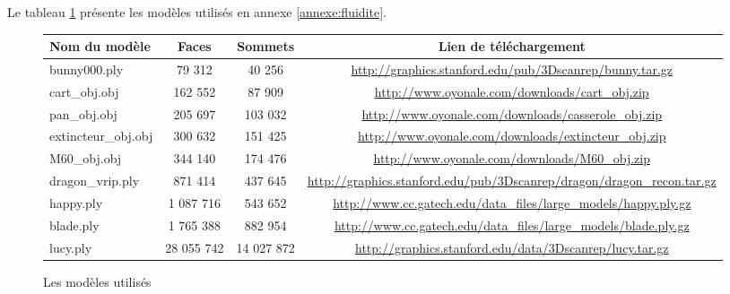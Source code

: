 Le tableau \ref{tab:modeles} présente les modèles utilisés en annexe \ref{annexe:fluidite}.


\begin{figure}[h]
  \begin{changemargin}{-4cm}{-4cm}
    \centering
    \begin{tabular}{|l|c|c|c|}
      \hline
      Nom du modèle & Faces & Sommets & Lien de téléchargement \\ \hline \hline
      bunny000.ply & 79 312 & 40 256 & \url{http://graphics.stanford.edu/pub/3Dscanrep/bunny.tar.gz} \\ \hline
      cart\_obj.obj & 162 552 & 87 909 & \url{http://www.oyonale.com/downloads/cart_obj.zip} \\ \hline
      pan\_obj.obj & 205 697 & 103 032 & \url{http://www.oyonale.com/downloads/casserole_obj.zip} \\ \hline
      extincteur\_obj.obj & 300 632 & 151 425 & \url{http://www.oyonale.com/downloads/extincteur_obj.zip} \\ \hline
      M60\_obj.obj & 344 140 & 174 476 & \url{http://www.oyonale.com/downloads/M60_obj.zip} \\ \hline
      dragon\_vrip.ply & 871 414 & 437 645 & \url{http://graphics.stanford.edu/pub/3Dscanrep/dragon/dragon_recon.tar.gz} \\ \hline
      happy.ply & 1 087 716 & 543 652 & \url{http://www.cc.gatech.edu/data_files/large_models/happy.ply.gz} \\ \hline
      blade.ply & 1 765 388 & 882 954 & \url{http://www.cc.gatech.edu/data_files/large_models/blade.ply.gz} \\ \hline
      lucy.ply & 28 055 742 & 14 027 872 & \url{http://graphics.stanford.edu/data/3Dscanrep/lucy.tar.gz} \\ \hline
    \end{tabular}
    \caption{Les modèles utilisés}
    \label{tab:modeles}
  \end{changemargin}
\end{figure}
